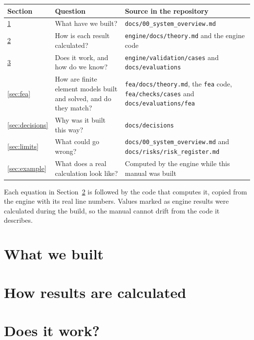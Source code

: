 \documentclass[11pt,letterpaper]{article}
\begin{document}
\begin{xltabular}{\linewidth}{lYY}
  \toprule
  \textbf{Section} & \textbf{Question} & \textbf{Source in the repository} \\
  \midrule
  \ref{sec:built} & What have we built? & \texttt{docs/00\_system\_overview.md} \\
  \ref{sec:theory} & How is each result calculated? & \texttt{engine/docs/theory.md} and the engine code \\
  \ref{sec:verification} & Does it work, and how do we know? & \texttt{engine/validation/cases} and \texttt{docs/evaluations} \\
  \ref{sec:fea} & How are finite element models built and solved, and do they match? & \texttt{fea/docs/theory.md}, the \texttt{fea} code, \texttt{fea/checks/cases} and \texttt{docs/evaluations/fea} \\
  \ref{sec:decisions} & Why was it built this way? & \texttt{docs/decisions} \\
  \ref{sec:limits} & What could go wrong? & \texttt{docs/00\_system\_overview.md} and \texttt{docs/risks/risk\_register.md} \\
  \ref{sec:example} & What does a real calculation look like? & Computed by the engine while this manual was built \\
  \bottomrule
\end{xltabular}

Each equation in Section~\ref{sec:theory} is followed by the code that computes it, copied from the engine with its
real line numbers. Values marked as engine results were calculated during the build, so the manual cannot drift from
the code it describes.

\section{What we built}\label{sec:built}


\section{How results are calculated}\label{sec:theory}


\section{Does it work?}\label{sec:verification}

\end{document}
